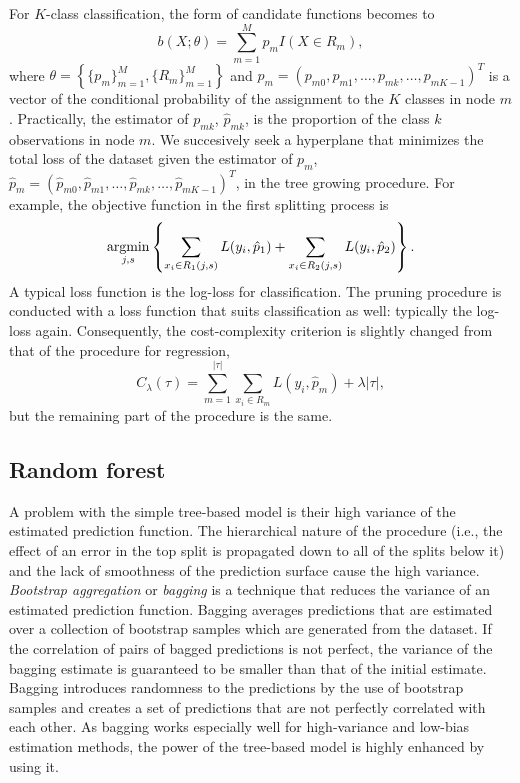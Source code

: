 \documentclass[12pt]{article}
\newcommand{\argmin}{\mathop{\rm argmin}\limits}
\begin{document}
For $K$-class classification, the form of candidate functions becomes to
\begin{equation*}
b(X;\theta) = \sum_{m=1}^M p_m I(X \in R_m),
\end{equation*}
where $\theta = \left\{\{p_m\}_{m=1}^M, \{R_m\}_{m=1}^M \right\}$ and $p_m = (p_{m0},p_{m1},\dots,p_{mk},\dots,p_{mK-1})^T$ is a vector of the conditional probability of the assignment to the $K$ classes in node $m$. Practically, the estimator of $p_{mk}$, $\hat{p}_{mk}$, is the proportion of the class $k$ observations in node $m$. We succesively seek a hyperplane that minimizes the total loss of the dataset given the estimator of $p_m$, $\hat{p}_m = (\hat{p}_{m0},\hat{p}_{m1},\dots,\hat{p}_{mk},\dots,\hat{p}_{mK-1})^T$, in the tree growing procedure. For example, the objective function in the first splitting process is
\begin{equation*}
\argmin_{j,s} \left\{\sum_{x_i \in R_1(j,s)} L(y_i,\hat{p}_1) + \sum_{x_i \in R_2(j,s)} L(y_i,\hat{p}_2)\right\}.
\end{equation*}
A typical loss function is the log-loss for classification. The pruning procedure is conducted with a loss function that suits classification as well: typically the log-loss again. Consequently, the cost-complexity criterion is slightly changed from that of the procedure for regression,
\begin{equation*}
C_{\lambda}(\tau) = \sum_{m=1}^{|\tau|} \sum_{x_i \in R_m} L(y_i,\hat{p}_m) + \lambda |\tau|,
\end{equation*}
but the remaining part of the procedure is the same.

\subsection{Random forest}

A problem with the simple tree-based model is their high variance of the estimated prediction function. The hierarchical nature of the procedure (i.e., the effect of an error in the top split is propagated down to all of the splits below it) and the lack of smoothness of the prediction surface cause the high variance. {\it Bootstrap aggregation} or {\it bagging} \parencite{Breiman1996} is a technique that reduces the variance of an estimated prediction function. Bagging averages predictions that are estimated over a collection of bootstrap samples which are generated from the dataset. If the correlation of pairs of bagged predictions is not perfect, the variance of the bagging estimate is guaranteed to be smaller than that of the initial estimate. Bagging introduces randomness to the predictions by the use of bootstrap samples and creates a set of predictions that are not perfectly correlated with each other. As bagging works especially well for high-variance and low-bias estimation methods, the power of the tree-based model is highly enhanced by using it.
\end{document}
